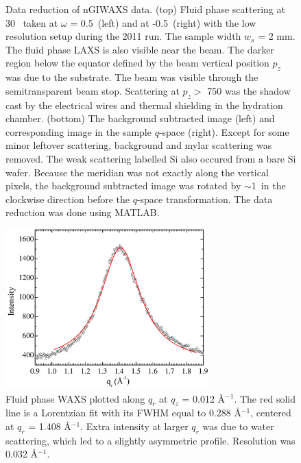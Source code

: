 \begin{figure}[htbp]
  {Data reduction of nGIWAXS data. (top) Fluid phase scattering at
  30 \textcelsius\ taken at $\omega$ = 0.5\textdegree\ (left) 
  and at -0.5\textdegree\ (right) with the low resolution setup during the 
  2011 run. The sample width $w_s$ = 2 mm.
  The fluid phase LAXS is also visible near the beam.  
  The darker region below the equator defined by 
  the beam vertical position $p_z$ was due to the substrate. The beam
  was visible through the semitransparent beam stop.
  Scattering at $p_z >$ 750 was the shadow cast by the electrical wires 
  and thermal shielding in the hydration chamber.
  (bottom) The background subtracted 
  image (left) and corresponding image in the sample $q$-space (right).
  Except for some minor leftover scattering, background and mylar scattering was 
  removed. The weak scattering labelled Si also occured from a bare Si wafer.  
  Because the meridian was not exactly along the vertical
  pixels, the background subtracted image was rotated by $\sim$1\textdegree\
  in the clockwise direction before the $q$-space transformation. The data
  reduction was done using MATLAB.}
  \label{fig:waxs_data_reduction}
\end{figure}

\begin{figure}[htbp]
  \centering
  \includegraphics[width=0.7\textwidth]{figures/ripple/nGIWAXS/fluid_qr}
  \caption[Fluid phase WAXS plotted along $q_r$ at $q_z$ = 0.012 \AA$^{-1}$]
  {Fluid phase WAXS plotted along $q_r$ at $q_z$ = 0.012 \AA$^{-1}$.
  The red solid line is a Lorentzian fit with its FWHM equal to 0.288 \AA$^{-1}$,
  centered at $q_r$ = 1.408 \AA$^{-1}$. 
  Extra intensity at larger $q_r$ was due to
  water scattering, which led to a slightly asymmetric profile.  
  Resolution was 0.032 \AA$^{-1}$.}
  \label{fig:fluid_qr}
\end{figure}

